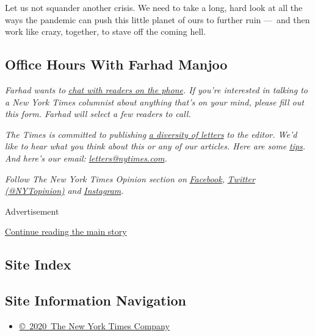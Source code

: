Let us not squander another crisis. We need to take a long, hard look at
all the ways the pandemic can push this little planet of ours to further
ruin ---~and then work like crazy, together, to stave off the coming
hell.

\hypertarget{office-hours-with-farhad-manjoo}{%
\subsection{Office Hours With Farhad
Manjoo}\label{office-hours-with-farhad-manjoo}}

\emph{Farhad wants to}
\href{https://www.nytimes.com/2019/05/16/opinion/farhad-office-hours.html?module=inline}{\emph{chat
with readers on the phone}}\emph{. If you're interested in talking to a
New York Times columnist about anything that's on your mind, please fill
out this form. Farhad will select a few readers to call.}

\emph{The Times is committed to publishing}
\href{https://www.nytimes.com/2019/01/31/opinion/letters/letters-to-editor-new-york-times-women.html}{\emph{a
diversity of letters}} \emph{to the editor. We'd like to hear what you
think about this or any of our articles. Here are some}
\href{https://help.nytimes.com/hc/en-us/articles/115014925288-How-to-submit-a-letter-to-the-editor}{\emph{tips}}\emph{.
And here's our email:}
\href{mailto:letters@nytimes.com}{\emph{letters@nytimes.com}}\emph{.}

\emph{Follow The New York Times Opinion section on}
\href{https://www.facebook.com/nytopinion}{\emph{Facebook}}\emph{,}
\href{http://twitter.com/NYTOpinion}{\emph{Twitter (@NYTopinion)}}
\emph{and}
\href{https://www.instagram.com/nytopinion/}{\emph{Instagram}}\emph{.}

Advertisement

\protect\hyperlink{after-bottom}{Continue reading the main story}

\hypertarget{site-index}{%
\subsection{Site Index}\label{site-index}}

\hypertarget{site-information-navigation}{%
\subsection{Site Information
Navigation}\label{site-information-navigation}}

\begin{itemize}
\tightlist
\item
  \href{https://help.nytimes.com/hc/en-us/articles/115014792127-Copyright-notice}{©~2020~The
  New York Times Company}
\end{itemize}

